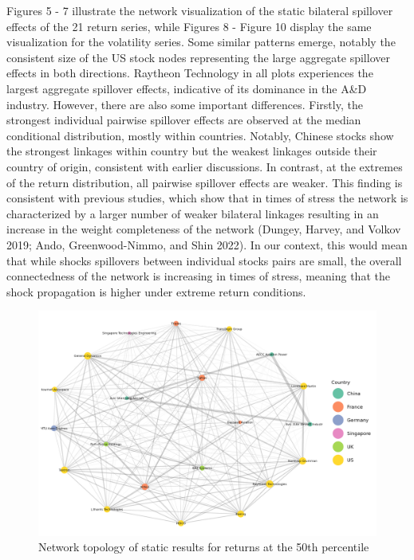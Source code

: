 \documentclass[
  letterpaper,
  DIV=11,
  numbers=noendperiod]{scrartcl}
\begin{document}
Figures 5 - 7 illustrate the network visualization of the static
bilateral spillover effects of the 21 return series, while Figures 8 -
Figure 10 display the same visualization for the volatility series. Some
similar patterns emerge, notably the consistent size of the US stock
nodes representing the large aggregate spillover effects in both
directions. Raytheon Technology in all plots experiences the largest
aggregate spillover effects, indicative of its dominance in the A\&D
industry. However, there are also some important differences. Firstly,
the strongest individual pairwise spillover effects are observed at the
median conditional distribution, mostly within countries. Notably,
Chinese stocks show the strongest linkages within country but the
weakest linkages outside their country of origin, consistent with
earlier discussions. In contrast, at the extremes of the return
distribution, all pairwise spillover effects are weaker. This finding is
consistent with previous studies, which show that in times of stress the
network is characterized by a larger number of weaker bilateral linkages
resulting in an increase in the weight completeness of the network
(Dungey, Harvey, and Volkov 2019; Ando, Greenwood-Nimmo, and Shin 2022).
In our context, this would mean that while shocks spillovers between
individual stocks pairs are small, the overall connectedness of the
network is increasing in times of stress, meaning that the shock
propagation is higher under extreme return conditions.

\begin{figure}[H]

{\centering \includegraphics[width=6.75in,height=\textheight]{plots/fig-rtn50.png}

}

\caption{\label{fig-rtn50}Network topology of static results for returns
at the 50th percentile}

\end{figure}
\end{document}
